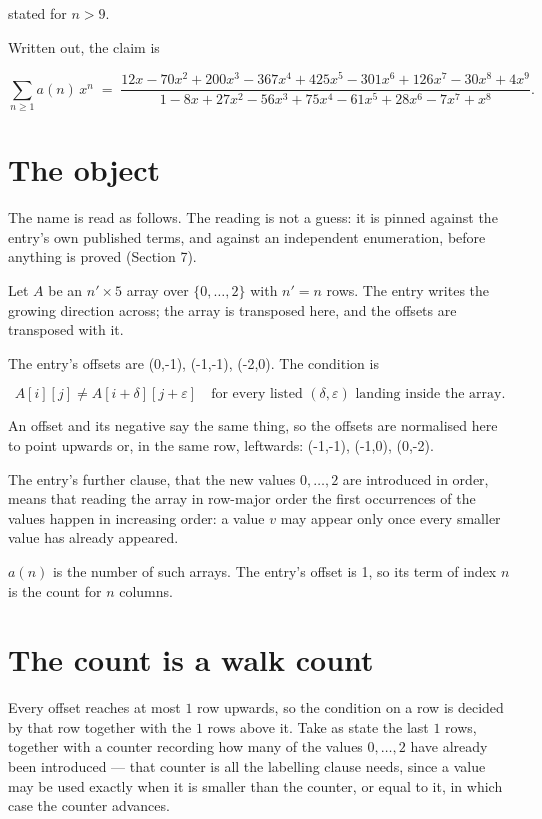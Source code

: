 \documentclass[11pt]{article}
\theoremstyle{definition}
\begin{document}
stated for $n > 9$.

Written out, the claim is

\[\sum_{n \ge 1} a(n)\,x^n \;=\; \frac{12x - 70x^{2} + 200x^{3} - 367x^{4} + 425x^{5} - 301x^{6} + 126x^{7} - 30x^{8} + 4x^{9}}{1 - 8x + 27x^{2} - 56x^{3} + 75x^{4} - 61x^{5} + 28x^{6} - 7x^{7} + x^{8}}.\]

\section{The object}

The name is read as follows. The reading is not a guess: it is pinned against the entry's own published terms, and against an independent enumeration, before anything is proved (Section 7).

Let $A$ be an $n' \times 5$ array over $\{0,\dots,2\}$ with $n' = n$ rows. The entry writes the growing direction across; the array is transposed here, and the offsets are transposed with it.

The entry's offsets are (0,-1), (-1,-1), (-2,0). The condition is

\[A[i][j] \ne A[i{+}\delta][j{+}\varepsilon]\quad\text{for every listed }(\delta,\varepsilon)\text{ landing inside the array.}\]

An offset and its negative say the same thing, so the offsets are normalised here to point upwards or, in the same row, leftwards: (-1,-1), (-1,0), (0,-2).

The entry's further clause, that the new values $0,\dots,2$ are introduced in order, means that reading the array in row-major order the first occurrences of the values happen in increasing order: a value $v$ may appear only once every smaller value has already appeared.

$a(n)$ is the number of such arrays. The entry's offset is 1, so its term of index $n$ is the count for $n$ columns.

\section{The count is a walk count}

Every offset reaches at most $1$ row upwards, so the condition on a row is decided by that row together with the $1$ rows above it. Take as state the last $1$ rows, together with a counter recording how many of the values $0,\dots,2$ have already been introduced --- that counter is all the labelling clause needs, since a value may be used exactly when it is smaller than the counter, or equal to it, in which case the counter advances.
\end{document}
